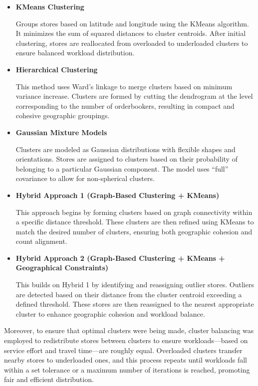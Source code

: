 \begin{itemize}
    \item \textbf{KMeans Clustering}  
    
    Groups stores based on latitude and longitude using the KMeans algorithm. It minimizes the sum of squared distances to cluster centroids. After initial clustering, stores are reallocated from overloaded to underloaded clusters to ensure balanced workload distribution.

    \item \textbf{Hierarchical Clustering}  
    
    This method uses Ward’s linkage to merge clusters based on minimum variance increase. Clusters are formed by cutting the dendrogram at the level corresponding to the number of orderbookers, resulting in compact and cohesive geographic groupings.

    \item \textbf{Gaussian Mixture Models}  
    
    Clusters are modeled as Gaussian distributions with flexible shapes and orientations. Stores are assigned to clusters based on their probability of belonging to a particular Gaussian component. The model uses “full” covariance to allow for non-spherical clusters.

    \item \textbf{Hybrid Approach 1 (Graph-Based Clustering + KMeans)}  
    
    This approach begins by forming clusters based on graph connectivity within a specific distance threshold. These clusters are then refined using KMeans to match the desired number of clusters, ensuring both geographic cohesion and count alignment.

    \item \textbf{Hybrid Approach 2 (Graph-Based Clustering + KMeans + Geographical Constraints)}  
    
    This builds on Hybrid 1 by identifying and reassigning outlier stores. Outliers are detected based on their distance from the cluster centroid exceeding a defined threshold. These stores are then reassigned to the nearest appropriate cluster to enhance geographic cohesion and workload balance.
\end{itemize}


Moreover, to ensure that optimal clusters were being made, cluster balancing was employed to redistribute 
stores between clusters to ensure workloads—based on service effort and travel time—are roughly equal.
 Overloaded clusters transfer nearby stores to underloaded ones, and this process repeats until workloads fall within a set tolerance or a maximum number of iterations is reached, promoting fair and efficient distribution.

